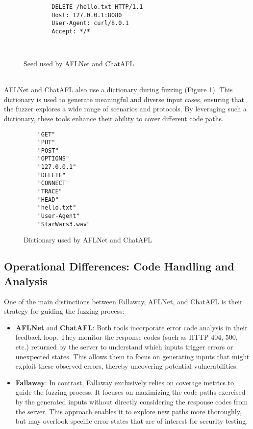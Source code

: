 \begin{figure}[H]
    \centering
    \begin{adjustbox}{valign=t}
    \begin{lstlisting}
        DELETE /hello.txt HTTP/1.1
        Host: 127.0.0.1:8080
        User-Agent: curl/8.0.1
        Accept: */*
    
    
    \end{lstlisting}
    \end{adjustbox}
    \caption{Seed used by AFLNet and ChatAFL}
\end{figure}
\phantom{}\\
AFLNet and ChatAFL also use a dictionary during fuzzing (Figure \ref{fig:dictionary}). This dictionary is used to generate meaningful and diverse input cases, ensuring that the fuzzer explores a wide range of scenarios and protocols. By leveraging such a dictionary, these tools enhance their ability to cover different code paths.
\begin{figure}[H]
    \centering
    \begin{adjustbox}{valign=t}
    \begin{lstlisting}
    "GET"
    "PUT"
    "POST"
    "OPTIONS"
    "127.0.0.1"
    "DELETE"
    "CONNECT"
    "TRACE"
    "HEAD"
    "hello.txt"
    "User-Agent"
    "StarWars3.wav"
    \end{lstlisting}
    \end{adjustbox}
    \caption{Dictionary used by AFLNet and ChatAFL}
    \label{fig:dictionary}
\end{figure}

\subsection{Operational Differences: Code Handling and Analysis}

One of the main distinctions between Fallaway, AFLNet, and ChatAFL is their strategy for guiding the fuzzing process:

\begin{itemize}
    \item \textbf{AFLNet} and \textbf{ChatAFL}: Both tools incorporate error code analysis in their feedback loop. They monitor the response codes (such as HTTP 404, 500, etc.) returned by the server to understand which inputs trigger errors or unexpected states. This allows them to focus on generating inputs that might exploit these observed errors, thereby uncovering potential vulnerabilities.
    \item \textbf{Fallaway}: In contrast, Fallaway exclusively relies on coverage metrics to guide the fuzzing process. It focuses on maximizing the code paths exercised by the generated inputs without directly considering the response codes from the server. This approach enables it to explore new paths more thoroughly, but may overlook specific error states that are of interest for security testing.
\end{itemize}

